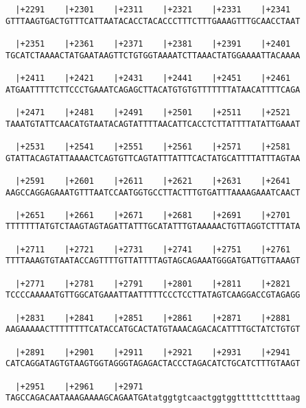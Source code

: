 \documentclass{article}
\begin{document}
\begin{Verbatim}
  |+2291    |+2301    |+2311    |+2321    |+2331    |+2341  
GTTTAAGTGACTGTTTCATTAATACACCTACACCCTTTCTTTGAAAGTTTGCAACCTAAT
                                                            
  |+2351    |+2361    |+2371    |+2381    |+2391    |+2401  
TGCATCTAAAACTATGAATAAGTTCTGTGGTAAAATCTTAAACTATGGAAAATTACAAAA
                                                            
  |+2411    |+2421    |+2431    |+2441    |+2451    |+2461  
ATGAATTTTTCTTCCCTGAAATCAGAGCTTACATGTGTGTTTTTTTATAACATTTTCAGA
                                                            
  |+2471    |+2481    |+2491    |+2501    |+2511    |+2521  
TAAATGTATTCAACATGTAATACAGTATTTTAACATTCACCTCTTATTTTATATTGAAAT
                                                            
  |+2531    |+2541    |+2551    |+2561    |+2571    |+2581  
GTATTACAGTATTAAAACTCAGTGTTCAGTATTTATTTCACTATGCATTTTATTTAGTAA
                                                            
  |+2591    |+2601    |+2611    |+2621    |+2631    |+2641  
AAGCCAGGAGAAATGTTTAATCCAATGGTGCCTTACTTTGTGATTTAAAAGAAATCAACT
                                                            
  |+2651    |+2661    |+2671    |+2681    |+2691    |+2701  
TTTTTTTATGTCTAAGTAGTAGATTATTTGCATATTTGTAAAAACTGTTAGGTCTTTATA
                                                            
  |+2711    |+2721    |+2731    |+2741    |+2751    |+2761  
TTTTAAAGTGTAATACCAGTTTTGTTATTTTAGTAGCAGAAATGGGATGATTGTTAAAGT
                                                            
  |+2771    |+2781    |+2791    |+2801    |+2811    |+2821  
TCCCCAAAAATGTTGGCATGAAATTAATTTTTCCCTCCTTATAGTCAAGGACCGTAGAGG
                                                            
  |+2831    |+2841    |+2851    |+2861    |+2871    |+2881  
AAGAAAAACTTTTTTTTCATACCATGCACTATGTAAACAGACACATTTTGCTATCTGTGT
                                                            
  |+2891    |+2901    |+2911    |+2921    |+2931    |+2941  
CATCAGGATAGTGTAAGTGGTAGGGTAGAGACTACCCTAGACATCTGCATCTTTGTAAGT
                                                            
  |+2951    |+2961    |+2971                                
TAGCCAGACAATAAAGAAAAGCAGAATGAtatggtgtcaactggtggtttttcttttaag
                                                            

\end{Verbatim}
\end{document}
